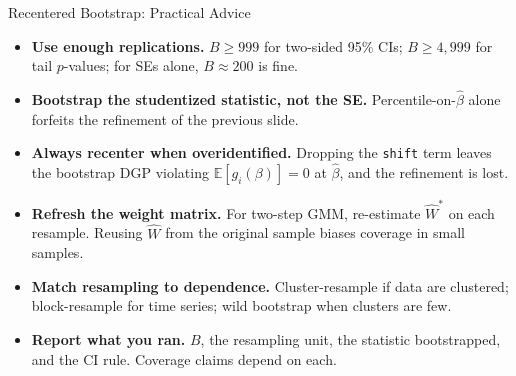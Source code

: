 \documentclass[aspectratio=169, handout]{beamer}
\numberwithin{equation}{section}
\begin{document}
\begin{frame}{Recentered Bootstrap: Practical Advice}

\begin{itemize}
\setlength{\itemsep}{4pt}
\item \textbf{Use enough replications.} $B \ge 999$ for two-sided 95\% CIs; $B \ge 4{,}999$ for tail $p$-values; for SEs alone, $B \approx 200$ is fine.

\item \textbf{Bootstrap the studentized statistic, not the SE.} Percentile-on-$\hat\beta$ alone forfeits the refinement of the previous slide.

\item \textbf{Always recenter when overidentified.} Dropping the \texttt{shift} term leaves the bootstrap DGP violating $\mathbb{E}[g_i(\beta)] = 0$ at $\hat\beta$, and the refinement is lost.

\item \textbf{Refresh the weight matrix.} For two-step GMM, re-estimate $\hat W^*$ on each resample. Reusing $\hat W$ from the original sample biases coverage in small samples.

\item \textbf{Match resampling to dependence.} Cluster-resample if data are clustered; block-resample for time series; wild bootstrap when clusters are few.

\item \textbf{Report what you ran.} $B$, the resampling unit, the statistic bootstrapped, and the CI rule. Coverage claims depend on each.
\end{itemize}

\end{frame}
\end{document}
